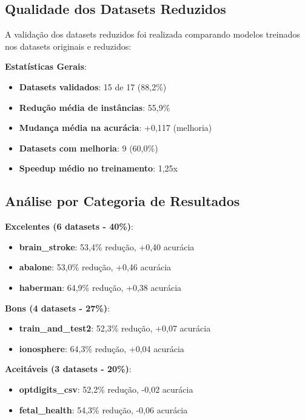 \documentclass[12pt,a4paper]{article}
\begin{document}
\subsection{Qualidade dos Datasets Reduzidos}

A validação dos datasets reduzidos foi realizada comparando modelos treinados nos datasets originais e reduzidos:

\textbf{Estatísticas Gerais}:
\begin{itemize}
    \item \textbf{Datasets validados}: 15 de 17 (88,2\%)
    \item \textbf{Redução média de instâncias}: 55,9\%
    \item \textbf{Mudança média na acurácia}: +0,117 (melhoria)
    \item \textbf{Datasets com melhoria}: 9 (60,0\%)
    \item \textbf{Speedup médio no treinamento}: 1,25x
\end{itemize}

\subsection{Análise por Categoria de Resultados}

\textbf{Excelentes (6 datasets - 40\%)}:
\begin{itemize}
    \item \textbf{brain\_stroke}: 53,4\% redução, +0,40 acurácia
    \item \textbf{abalone}: 53,0\% redução, +0,46 acurácia
    \item \textbf{haberman}: 64,9\% redução, +0,38 acurácia
\end{itemize}

\textbf{Bons (4 datasets - 27\%)}:
\begin{itemize}
    \item \textbf{train\_and\_test2}: 52,3\% redução, +0,07 acurácia
    \item \textbf{ionosphere}: 64,3\% redução, +0,04 acurácia
\end{itemize}

\textbf{Aceitáveis (3 datasets - 20\%)}:
\begin{itemize}
    \item \textbf{optdigits\_csv}: 52,2\% redução, -0,02 acurácia
    \item \textbf{fetal\_health}: 54,3\% redução, -0,06 acurácia
\end{itemize}
\end{document}
